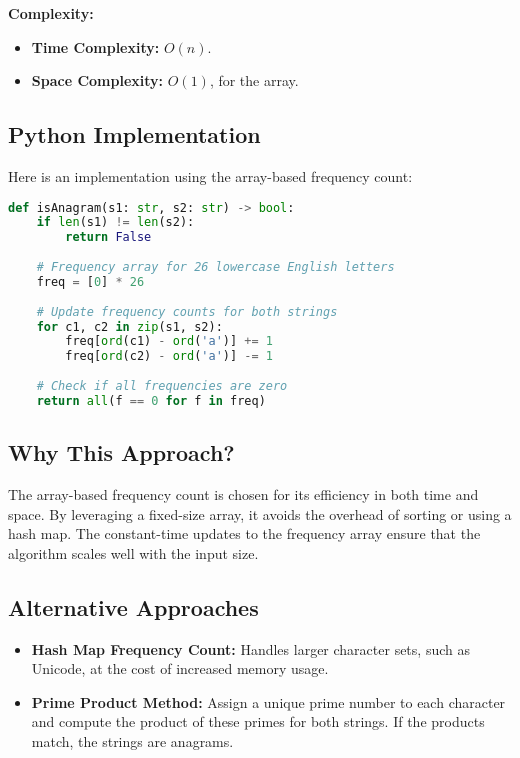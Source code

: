 \textbf{Complexity:}
\begin{itemize}
    \item \textbf{Time Complexity:} \(O(n)\).
    \item \textbf{Space Complexity:} \(O(1)\), for the array.
\end{itemize}

\subsection*{Python Implementation}
Here is an implementation using the array-based frequency count:

\begin{fullwidth}
\begin{lstlisting}[language=Python]
def isAnagram(s1: str, s2: str) -> bool:
    if len(s1) != len(s2):
        return False
    
    # Frequency array for 26 lowercase English letters
    freq = [0] * 26
    
    # Update frequency counts for both strings
    for c1, c2 in zip(s1, s2):
        freq[ord(c1) - ord('a')] += 1
        freq[ord(c2) - ord('a')] -= 1
    
    # Check if all frequencies are zero
    return all(f == 0 for f in freq)
\end{lstlisting}
\end{fullwidth}

\subsection*{Why This Approach?}
The array-based frequency count is chosen for its efficiency in both time and space. By leveraging a fixed-size array, it avoids the overhead of sorting or using a hash map. The constant-time updates to the frequency array ensure that the algorithm scales well with the input size.

\subsection*{Alternative Approaches}
\begin{itemize}
    \item \textbf{Hash Map Frequency Count:} Handles larger character sets, such as Unicode, at the cost of increased memory usage.
    \item \textbf{Prime Product Method:} Assign a unique prime number to each character and compute the product of these primes for both strings. If the products match, the strings are anagrams.
\end{itemize}

